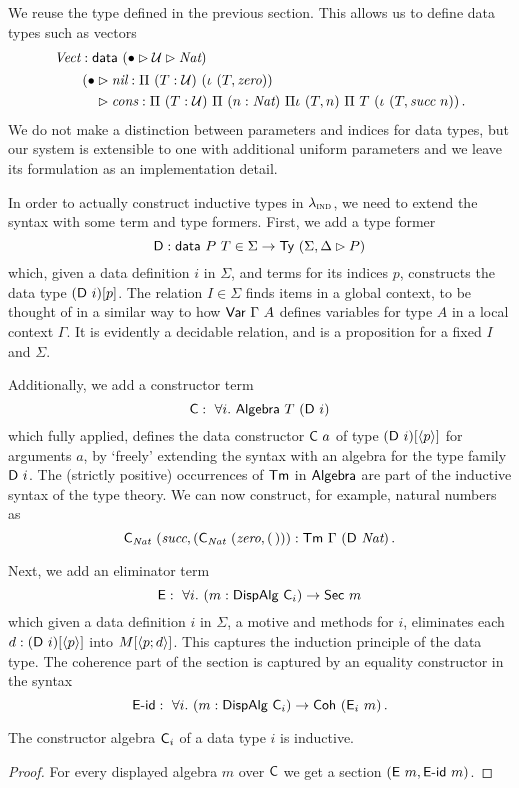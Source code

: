 We reuse the  type defined in the previous section. This allows us
to define data types such as vectors
\begin{align*}
	 & \textit{Vect} : \textsf{data}\ (\bullet \rhd \mathcal{U} \rhd \textit{Nat})               \\
	 & \quad\begin{aligned}
		        \quad (\bullet & \rhd \textit{nil} : \Pi\ (T : \mathcal{U})\ (\iota\ (T, \textit{zero}))                                                          \\
		        \quad          & \rhd \textit{cons} : \Pi\ (T : \mathcal{U})\ \Pi\ (n : \textit{Nat})\ \Pi\iota\ (T, n)\ \Pi\ T\ (\iota\ (T, \textit{succ}\ n)) \,.
	        \end{aligned}
\end{align*}
We do not make a distinction between parameters and indices for data types, but
our system is extensible to one with additional uniform parameters and we leave its
formulation as an implementation detail.

In order to actually construct inductive types in $\lambda_{\textsc{ind}}$, we need to
extend the syntax with some term and type formers. First, we add a type former
\[
	\mta{D} : \mta{data}\ P\ T \in \Sigma \to \Ty\ (\Sigma, \Delta \rhd P)
\]
which, given a data definition $i$ in $\Sigma$, and terms for its
indices $p$, constructs the data type $(\mta{D}\ i)[p]$. The relation $I \in
\Sigma$ finds items in a global context, to be thought of in a similar way to how
$\textsf{Var}\ \Gamma\ A$ defines variables for type $A$ in a local context
$\Gamma$. It is evidently a decidable relation, and is a proposition for a fixed
$I$ and $\Sigma$.

Additionally, we add a constructor term
\[
	\mta{C} :\ \forall i.\ \mta{Algebra}\ T\ (\mta{D}\ i)
\]
which fully applied, defines the data constructor $\textsf{C}\ a$ of type
$(\textsf{D}\ i)[\langle p\rangle]$ for arguments $a$, by `freely' extending the syntax with
an algebra for the type family $\textsf{D}\ i$. The (strictly positive) occurrences
of $\textsf{Tm}$ in $\textsf{Algebra}$ are part of the inductive syntax of the type
theory. We can now construct, for example, natural numbers as
\[
    \mta{C}_{\textit{Nat}}\ (\textit{succ}, (\mta{C}_{\textit{Nat}}\ (\textit{zero}, (\,))) : \mta{Tm}\ \Gamma\ (\mta{D}\ \textit{Nat}) \,.
\]

Next, we add an eliminator term
\[
	\textsf{E} :\ \forall i.\ (m : \textsf{DispAlg}\ \textsf{C}_i) \to \textsf{Sec}\ m
\]
which given a data definition $i$ in $\Sigma$, a motive and methods for $i$,
eliminates each $d : (\textsf{D}\ i)[\langle p\rangle]$ into $M[\langle p;d\rangle]$. This captures
the induction principle of the data type. The coherence part of the section is
captured by an equality constructor in the syntax
\[
	\mta{E-id} :\ \forall i.\ (m : \mta{DispAlg}\ \mta{C}_i) \to \mta{Coh}\ (\mta{E}_i\ m) \,.
\]
\begin{lemma}
	The constructor algebra $\textsf{C}_i$ of a data type $i$ is inductive.
	\begin{proof}
		For every displayed algebra $m$ over $\textsf{C}$ we get a section $(\textsf{E}\ m, \textsf{E-id}\ m)$.
	\end{proof}
\end{lemma}

